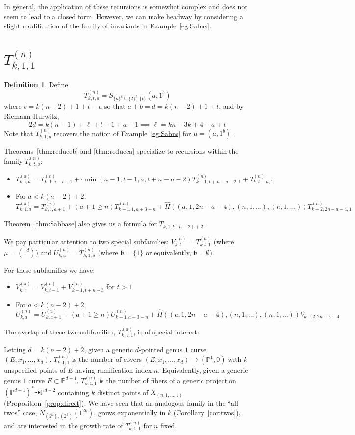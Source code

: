 \documentclass[thesis]{thesis-umich}           %
\renewcommand{\b}{\mathfrak b}
\renewcommand{\P}{\mathbb P}
\theoremstyle{definition}
\newtheorem{dfn}[thm]{Definition}
\begin{document}
In general, the application of these recursions is somewhat complex and
does not seem to lead to a closed form. However, we can make headway
by considering a slight modification of the family of invariants
in Example~\ref{eg:Sabns}.


\section{$T_{k,1,1}^{(n)}$}

\begin{dfn}
  Define
  \[
  T_{k,t,a}^{(n)}=S_{\{n\}^k\cup\{2\}^{\ell},\{t\}}(a,1^b)
  \]
  where $b=k(n-2)+1+t-a$ so that $a+b=d=k(n-2)+1+t$, and
  by Riemann-Hurwitz,
  \[
  2d=k(n-1)+\ell+t-1+a-1\implies \ell=kn-3k+4-a+t
  \]
  Note that $T_{k,1,a}^{(n)}$
  recovers the notion of Example~\ref{eg:Sabns} for $\mu=(a,1^b)$.
  \end{dfn}

Theorems~\ref{thm:reduceb} and \ref{thm:reducea} specialize to recursions
within the family $T_{k,t,a}^{(n)}$:
\begin{itemize}
\item $T_{k,t,a}^{(n)}=T_{k,1,a-t+1}^{(n)}+\cdot\min(n-1,t-1,a,t+n-a-2)T_{k-1,t+n-a-2,1}^{(n)}+ T_{k,t-a,1}^{(n)}$
  \item For $a<k(n-2)+2$, \[T_{k,1,a}^{(n)}=T_{k,1,a+1}^{(n)}+(a+1\geq n)T_{k-1,1,a+3-n}^{(n)}+\hat H((a,1,2n-a-4),(n,1,\dots),(n,1,\dots))T_{k-2,2n-a-4,1}^{(n)}\]
\end{itemize}
Theorem~\ref{thm:Sabbase} also gives us a formula for
$T_{k,1,k(n-2)+2}$.

We pay particular attention to two special subfamilies:
$V_{k,t}^{(n)}=T_{k,t,1}^{(n)}$ (where $\mu=(1^d)$) and $U_{k,a}^{(n)}=T_{k,1,a}^{(n)}$
(where $\b=\{1\}$ or equivalently, $\b=\emptyset$). 

For these subfamilies we have:
\begin{itemize}
\item $V_{k,t}^{(n)}=V_{k,t-1}^{(n)}+V_{k-1,t+n-3}^{(n)}$ for $t>1$
  \item For $a<k(n-2)+2$, \[U_{k,a}^{(n)}=U_{k,a+1}^{(n)}+(a+1\geq n)U_{k-1,a+3-n}^{(n)}+\hat H((a,1,2n-a-4),(n,1,\dots),(n,1,\dots)) V_{k-2,2n-a-4}\]
\end{itemize}

The overlap of these two subfamilies, $T_{k,1,1}^{(n)}$, is of special interest:

Letting $d=k(n-2)+2$,
given a generic $d$-pointed genus $1$ curve $(E,x_1,\dots,x_d)$,
$T_{k,1,1}^{(n)}$ is the number of covers $(E,x_1,\dots,x_d)\to(\P^1,0)$
with $k$ unspecified points of $E$ having ramification index $n$.
Equivalently, given a generic genus $1$ curve $E\subset \P^{d-1}$,
$T_{k,1,1}^{(n)}$ is the number of fibers of a generic projection
$(\P^{d-1})^*\dashrightarrow\P^{d-2}$ containing $k$ distinct points
of $X_{(n,1,\dots,1)}$ (Proposition~\ref{prop:direct}).
We have
seen that an analogous family in the ``all twos'' case, $N_{(2^k),(2^k)}(1^{2k})$,
grows exponentially in $k$ (Corollary~\ref{cor:twos}), and are interested
in the growth rate of $T_{k,1,1}^{(n)}$ for $n$ fixed.
\end{document}
